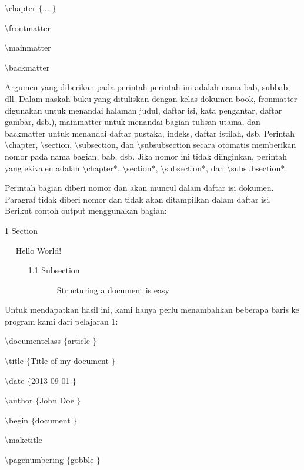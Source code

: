 {\fontsize{10pt}{10pt}\selectfont  $  \setminus  $chapter $  \{  $... $  \}  $}
 \par
\vspace{9pt}
{\fontsize{10pt}{10pt}\selectfont  $  \setminus  $frontmatter}
 \par
\vspace{9pt}
{\fontsize{10pt}{10pt}\selectfont  $  \setminus  $mainmatter}
 \par
\vspace{9pt}
{\fontsize{10pt}{10pt}\selectfont  $  \setminus  $backmatter}
 \par
\vspace{12pt}
\hspace{0.50in} Argumen yang diberikan pada perintah-perintah ini adalah nama bab, subbab, dll. Dalam naskah buku yang dituliskan dengan kelas dokumen book, fronmatter digunakan untuk menandai halaman judul, daftar isi, kata pengantar, daftar gambar, dsb.), mainmatter untuk menandai bagian tulisan utama, dan backmatter untuk menandai daftar pustaka, indeks, daftar istilah, dsb. Perintah  $  \setminus  $chapter,  $  \setminus  $section,  $  \setminus  $subsection, dan  $  \setminus  $subsubsection secara otomatis memberikan nomor pada nama bagian, bab, dsb. Jika nomor ini tidak diinginkan, perintah yang ekivalen adalah  $  \setminus  $chapter*,  $  \setminus  $section*,  $  \setminus  $subsection*, dan  $  \setminus  $subsubsection*.
 \par
\vspace{12pt}
\hspace{0.50in} Perintah bagian diberi nomor dan akan muncul dalam daftar isi dokumen. Paragraf tidak diberi nomor dan tidak akan ditampilkan dalam daftar isi. Berikut contoh output menggunakan bagian:
 \par
1 Section
 \par
~~ Hello World!
 \par
~~~~~ 1.1 Subsection
 \par
~~~~~~~~~~~~ Structuring a document is easy
 \par
\vspace{12pt}
\hspace{0.50in} Untuk mendapatkan hasil ini, kami hanya perlu menambahkan beberapa baris ke program kami dari pelajaran 1:
 \par
 $  \setminus  $documentclass $  \{  $article $  \}  $
 \par
\vspace{12pt}
 $  \setminus  $title $  \{  $Title of my document $  \}  $
 \par
 $  \setminus  $date $  \{  $2013-09-01 $  \}  $
 \par
 $  \setminus  $author $  \{  $John Doe $  \}  $
 \par
\vspace{12pt}
 $  \setminus  $begin $  \{  $document $  \}  $
 \par
\vspace{12pt}
 $  \setminus  $maketitle
 \par
 $  \setminus  $pagenumbering $  \{  $gobble $  \}  $
 \par

